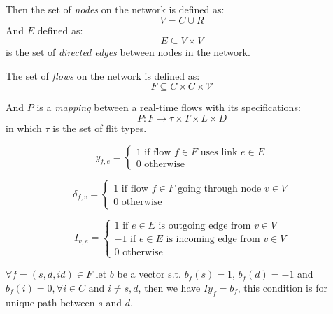 \documentclass[10pt]{article}
\begin{document}
Then the set of {\em nodes} on the network is defined as:
\begin{equation}\label{reio}
V = C \cup R
\end{equation}
And $E$ defined as:
\begin{equation}
E \subseteq V \times V 
\end{equation}
is the set of {\em directed edges} between nodes in the network.

The set of {\em flows} on the network is defined as:
\begin{equation}
F \subseteq C \times C \times \mathcal{V} 
\end{equation}

And $P$ is a {\em mapping } between a real-time flows with its specifications:
\begin{equation}
P:F \rightarrow \tau \times T \times L \times D
\end{equation}
in which $\tau$ is the set of flit types.

\begin{equation}
y_{f,e} = \left\{ \begin{array}{lrc}
1 \mbox{ if flow } f \in F \mbox{ uses link } e \in E \\
0 \mbox{ otherwise} 
\end{array}\right.
\end{equation}

\begin{equation}
\delta_{f,v} = \left\{ \begin{array}{lrc}
1 \mbox{ if flow } f \in F \mbox{ going through node } v \in V \\
0 \mbox{ otherwise} 
\end{array}\right.
\end{equation}

\begin{equation}
I_{v,e} = \left\{ \begin{array}{lrc}
1 \mbox{ if } e \in E \mbox{ is outgoing edge from } v \in V \\
-1 \mbox{ if } e \in E \mbox{ is incoming edge from } v \in V \\
0 \mbox{ otherwise}
\end{array}\right. 
\end{equation}

$\forall f=(s, d, id) \in F$  let $b$ be a vector s.t. $b_f(s) = 1$, 
$b_f(d) = -1$ and $b_f(i) = 0, \forall i \in C \mbox{ and } i \neq s, d$,
 then we have $Iy_f=b_f$, this condition is for unique path between $s$ and $d$.
\end{document}
